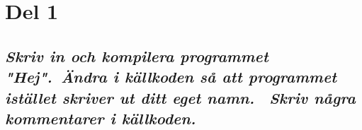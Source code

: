 \documentclass[../main.tex]{subfiles}
\begin{document}
\section{Del 1}
\subsection{\textit{Skriv in och kompilera programmet "Hej".\ Ändra i källkoden så att programmet istället skriver ut ditt eget namn. \ Skriv några kommentarer i källkoden.}}


\end{document}
